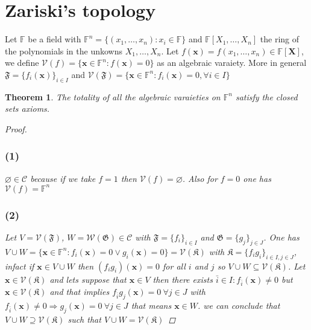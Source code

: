 \documentclass{article}
\newtheorem{theorem}{Theorem}
\begin{document}
    \section*{Zariski's topology}
        Let $\mathbb{F}$ be a field with $\mathbb{F}^n = \{ (x_1,\dots,x_n) : x_i \in \mathbb{F} \} $ and $\mathbb{F}[X_1,\dots, X_n]$ the ring of the polynomials in the unkowns $X_1,\dots,X_n$. Let $f(\textbf{x}) = f(x_1,\dots,x_n) \in \mathbb{F}[\textbf{X}]$, we define $\mathcal{V}(f) = \{ \textbf{x} \in \mathbb{F}^n : f(\textbf{x}) = 0\}$ as an algebraic varaiety. More in general $\mathfrak{F} = \{ f_i(\textbf{x}) \}_{i \in I}$ and  $\mathcal{V}(\mathfrak{F}) = \{ \textbf{x} \in \mathbb{F}^n : f_i(\textbf{x}) = 0, \forall i\in I \}$
        \begin{theorem}
            The totality of all the algebraic varaieties on $\mathbb{F}^n$ satisfy the closed sets axioms.
            \begin{proof}
                \subsubsection*{(1)}
                    $\varnothing \in \mathcal{C}$ because  if we take $f = 1$ then $\mathcal{V}(f) = \varnothing$. Also for $f = 0$ one has $\mathcal{V}(f) = \mathbb{F}^n$
                \subsubsection*{(2)}
                    Let $V = \mathcal{V}(\mathfrak{F})$, $W = \mathcal{W}(\mathfrak{G}) \in \mathcal{C}$ with $\mathfrak{F} = \{ f_i \}_{i\in I}$ and $\mathfrak{G} = \{ g_j \}_{j\in J}$.
                    One has $V \cup W = \{ \textbf{x} \in \mathbb{F}^n : f_i(\textbf{x}) = 0 \vee g_i(\textbf{x}) = 0 \} = \mathcal{V}(\mathfrak{K})$ with $\mathfrak{K} = \{ f_ig_i \}_{i \in I,j\in J}$, infact if $\textbf{x} \in V \cup W$ then $(f_ig_i)(\textbf{x}) = 0$ for all $i$ and $j$ so $V \cup W \subseteq \mathcal{V}(\mathfrak{K})$.
                    Let $\textbf{x} \in \mathcal{V}(\mathfrak{K})$ and lets suppose that $\textbf{x} \in V$ then there exists $\bar{i} \in I : f_{\bar{i}}(\textbf{x}) \neq 0$ but $\textbf{x} \in \mathcal{V}(\mathfrak{K})$ and that implies $f_{\bar{i}}g_j(\textbf{x}) = 0 \ \forall j \in J$ with $f_{\bar{i}}(\textbf{x}) \neq 0 \Rightarrow g_j(\textbf{x}) = 0 \ \forall j\in J$ that means $\textbf{x} \in W$. we can conclude that $V \cup W \supseteq \mathcal{V}(\mathfrak{K})$ such that $V \cup W = \mathcal{V}(\mathfrak{K})$

\end{proof}
\end{theorem}
\end{document}
